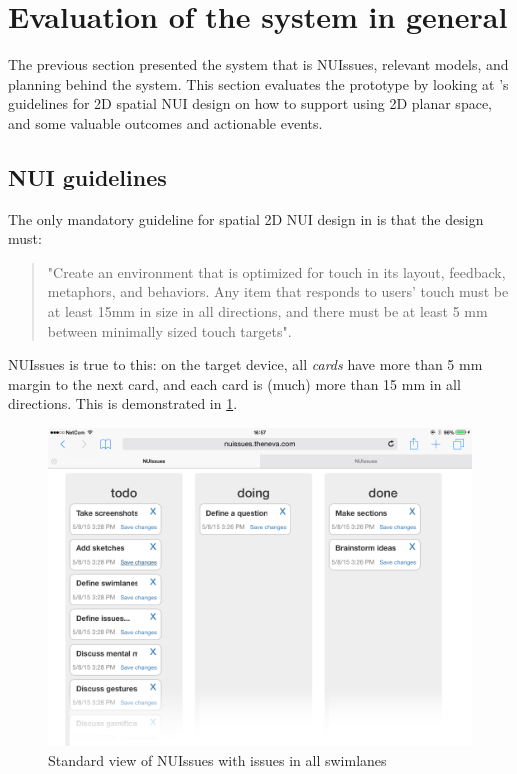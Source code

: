 \section{Evaluation of the system in general}

The previous section presented the system that is NUIssues, relevant models, and planning behind the system. This section evaluates the prototype by looking at \textcite[34]{wigdow-wixon:brave-nui-world:2011}'s guidelines for 2D spatial NUI design on how to support using 2D planar space, and some valuable outcomes and actionable events.

\subsection{NUI guidelines}

The only mandatory guideline for spatial 2D NUI design in \textcite[34]{wigdow-wixon:brave-nui-world:2011} is that the design must:

\begin{quote}
"Create an environment that is optimized for touch in its layout, feedback, metaphors, and behaviors. Any item that responds to users' touch must be at least 15mm in size in all directions, and there must be at least 5 mm between minimally sized touch targets".
\end{quote}

NUIssues is true to this: on the target device, all \textit{cards} have more than 5 mm margin to the next card, and each card is (much) more than 15 mm in all directions. This is demonstrated in \ref{figure:standard-view}.

\begin{figure}[H]
    \centerline{\includegraphics[scale=0.4]{images/nuissues-screenshots/01-default-all-swimlanes}}
    \caption{Standard view of NUIssues with issues in all swimlanes}
    \label{figure:standard-view}
\end{figure}

